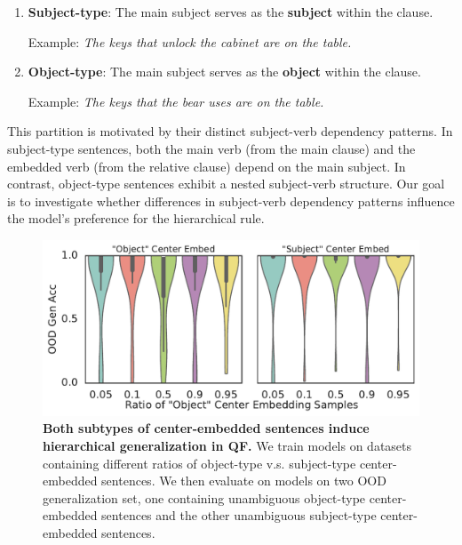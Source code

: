 \begin{enumerate}[itemsep=4pt,labelindent=2pt,topsep=0pt,parsep=0pt,partopsep=1pt,align=left,leftmargin=*]
    \item \textbf{Subject-type}: The main subject serves as the \textbf{subject} within the clause.

    Example: \textit{The keys that unlock the cabinet are on the table.}

    \item \textbf{Object-type}: The main subject serves as the \textbf{object} within the clause.
    
    Example:\textit{ The keys that the bear uses are on the table.}
\end{enumerate}

This partition is motivated by their distinct subject-verb dependency patterns. In subject-type sentences, both the main verb (from the main clause) and the embedded verb (from the relative clause) depend on the main subject. In contrast, object-type sentences exhibit a nested subject-verb structure. Our goal is to investigate whether differences in subject-verb dependency patterns influence the model’s preference for the hierarchical rule.



\begin{figure}[ht]
    \centering
    \includegraphics[width=0.6\linewidth]{figures/qf_rc_type.pdf}
    \caption{\textbf{Both subtypes of center-embedded sentences induce hierarchical generalization in QF.} We train models on datasets containing different ratios of object-type v.s. subject-type center-embedded sentences. We then evaluate on models on two OOD generalization set, one containing unambiguous object-type center-embedded sentences and the other unambiguous subject-type center-embedded sentences.}
    \label{fig:qf_rc_type}
\end{figure}

